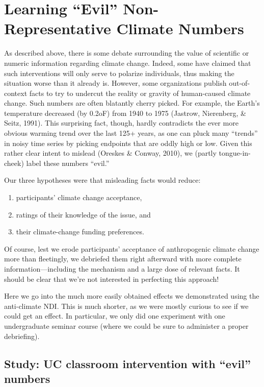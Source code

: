 \graphicspath{{evil-ndi/}}

\chapter{Learning \texorpdfstring{``Evil''}{"Evil"} Non-Representative Climate Numbers}
\label{chap:evilndi}

As described above, there is some debate surrounding the value of scientific or
numeric information regarding climate change. Indeed, some have claimed that
such interventions will only serve to polarize individuals, thus making the
situation worse than it already is. However, some organizations publish
out-of-context facts to try to undercut the reality or gravity of human-caused
climate change. Such numbers are often blatantly cherry picked. For example, the
Earth’s temperature decreased (by 0.2oF) from 1940 to 1975 (Jastrow, Nierenberg,
\& Seitz, 1991). This surprising fact, though, hardly contradicts the ever more
obvious warming trend over the last 125+ years, as one can pluck many ``trends''
in noisy time series by picking endpoints that are oddly high or low. Given this
rather clear intent to mislead (Oreskes \& Conway, 2010), we (partly
tongue-in-cheek) label these numbers ``evil.'' 

Our three hypotheses were that misleading facts would reduce:
\begin{enumerate}
    \item participants’ climate change acceptance, 
    \item ratings of their knowledge of the issue, and 
    \item their climate-change funding preferences.
\end{enumerate}
Of course, lest we erode participants’ acceptance of anthropogenic climate
change more than fleetingly, we debriefed them right afterward with more
complete information---including the mechanism and a large dose of relevant
facts. It should be clear that we're not interested in perfecting this approach! 

Here we go into the much more easily obtained effects we demonstrated using the
anti-climate NDI. This is much shorter, as we were mostly curious to see if we
could get an effect. In particular, we only did one experiment with one
undergraduate seminar course (where we could be sure to administer a proper
debriefing).

\section{Study: UC classroom intervention with \texorpdfstring{“evil”}{"evil"}
    numbers}

